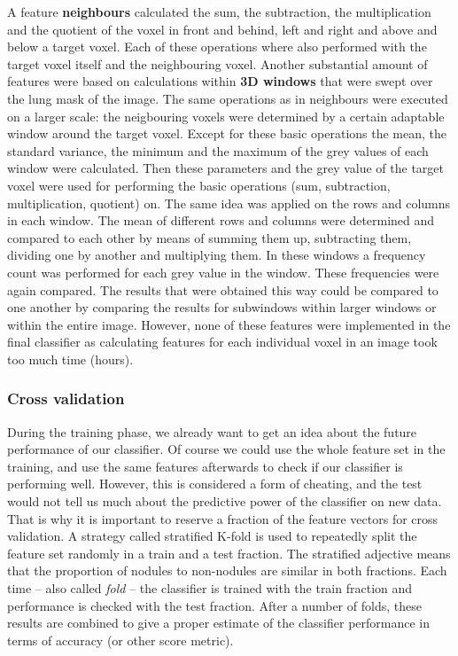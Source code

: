 A feature \textbf{neighbours} calculated the sum, the subtraction, the
multiplication and the quotient of the voxel in front and behind, left and right
and above and below a target voxel. Each of these operations where also
performed with the target voxel itself and the neighbouring voxel. Another
substantial amount of features were based on calculations within \textbf{3D
windows} that were swept over the lung mask of the image. The same operations
as in neighbours were executed on a larger scale: the neigbouring voxels were
determined by a certain adaptable window around the target voxel. Except for
these basic operations the mean, the standard variance, the minimum and the
maximum of the grey values of each window were calculated. Then these parameters
and the grey value of the target voxel were used for performing the basic
operations (sum, subtraction, multiplication, quotient) on. The same idea was
applied on the rows and columns in each window. The mean of different rows and
columns were determined and compared to each other by means of summing them up,
subtracting them, dividing one by another and multiplying them. In these windows
a frequency count was performed for each grey value in the window. These
frequencies were again compared. The results that were obtained this way could
be compared to one another by comparing the results for subwindows within larger
windows or within the entire image. However, none of these features were
implemented in the final classifier as calculating features for each individual
voxel in an image took too much time (hours).

\subsubsection{Cross validation}
During the training phase, we already want to get an idea about the future
performance of our classifier. Of course we could use the whole feature set in
the training, and use the same features afterwards to check if our classifier is
performing well. However, this is considered a form of cheating, and the test
would not tell us much about the predictive power of the classifier on new data.
That is why it is important to reserve a fraction of the feature vectors for
cross validation. A strategy called stratified K-fold is used to repeatedly
split the feature set randomly in a train and a test fraction.
The stratified adjective means that the proportion of nodules to non-nodules are
similar in both fractions. Each time -- also called \textit{fold} -- the
classifier is trained with the train fraction and performance is checked with
the test fraction. After a number of folds, these results are combined to give a
proper estimate of the classifier performance in terms of accuracy (or other
score metric).

